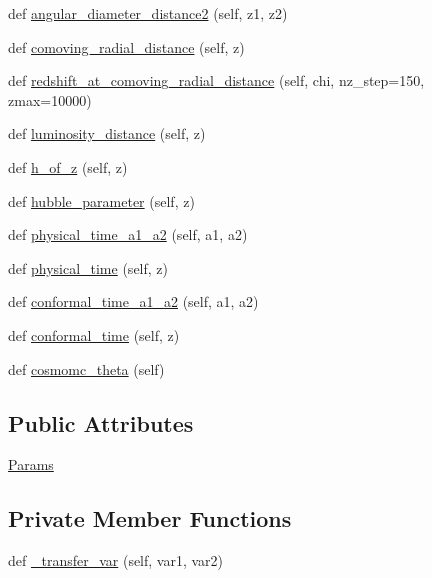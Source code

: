 \begin{DoxyCompactItemize}
def \mbox{\hyperlink{classcamb_1_1camb_1_1CAMBdata_ae4db43918bfea949a2ab44a2939e380d}{angular\+\_\+diameter\+\_\+distance2}} (self, z1, z2)
\item 
def \mbox{\hyperlink{classcamb_1_1camb_1_1CAMBdata_af0ce3f135c3734167c4474b63874f89d}{comoving\+\_\+radial\+\_\+distance}} (self, z)
\item 
def \mbox{\hyperlink{classcamb_1_1camb_1_1CAMBdata_a98a6c746b0bad46a24627c9fb384ecc6}{redshift\+\_\+at\+\_\+comoving\+\_\+radial\+\_\+distance}} (self, chi, nz\+\_\+step=150, zmax=10000)
\item 
def \mbox{\hyperlink{classcamb_1_1camb_1_1CAMBdata_abae42ef628ce5258f1b8ce60ccc91846}{luminosity\+\_\+distance}} (self, z)
\item 
def \mbox{\hyperlink{classcamb_1_1camb_1_1CAMBdata_a19e14cac73b780bba9087500f650d78c}{h\+\_\+of\+\_\+z}} (self, z)
\item 
def \mbox{\hyperlink{classcamb_1_1camb_1_1CAMBdata_ad9700493862b05ad5d794ffeae824049}{hubble\+\_\+parameter}} (self, z)
\item 
def \mbox{\hyperlink{classcamb_1_1camb_1_1CAMBdata_a4dd9bc539d831789e3fbad5bb882111e}{physical\+\_\+time\+\_\+a1\+\_\+a2}} (self, a1, a2)
\item 
def \mbox{\hyperlink{classcamb_1_1camb_1_1CAMBdata_a220cd9761a72b0038e0928aa01617fe5}{physical\+\_\+time}} (self, z)
\item 
def \mbox{\hyperlink{classcamb_1_1camb_1_1CAMBdata_a9cd584b66e9c6b2cbbbce97eacf6a721}{conformal\+\_\+time\+\_\+a1\+\_\+a2}} (self, a1, a2)
\item 
def \mbox{\hyperlink{classcamb_1_1camb_1_1CAMBdata_a6d9d95cf253bf830576f17763ecc9faa}{conformal\+\_\+time}} (self, z)
\item 
def \mbox{\hyperlink{classcamb_1_1camb_1_1CAMBdata_a7168fe972dc4ac167ae427fd91439ed2}{cosmomc\+\_\+theta}} (self)
\end{DoxyCompactItemize}
\subsection*{Public Attributes}
\begin{DoxyCompactItemize}
\item 
\mbox{\hyperlink{classcamb_1_1camb_1_1CAMBdata_ab333dd987280e2ea9de0bf1d2d42eb5d}{Params}}
\end{DoxyCompactItemize}
\subsection*{Private Member Functions}
\begin{DoxyCompactItemize}
\item 
def \mbox{\hyperlink{classcamb_1_1camb_1_1CAMBdata_afe7429cb1e7bf51726bd2793648b42d7}{\+\_\+transfer\+\_\+var}} (self, var1, var2)
\end{DoxyCompactItemize}
